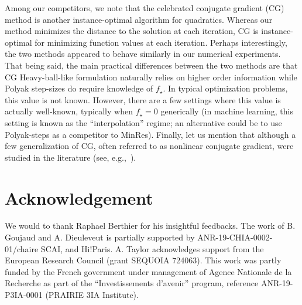 \documentclass{article}
\begin{document}
    Among our competitors, we note that the celebrated conjugate gradient (CG) method is another instance-optimal algorithm for quadratics.
    Whereas our method minimizes the distance to the solution at each iteration, CG is instance-optimal for minimizing function values at each iteration.
    Perhaps interestingly, the two methods appeared to behave similarly in our numerical experiments.
    That being said, the main practical differences between the two methods are that
    CG Heavy-ball-like formulation naturally relies on higher order information while Polyak step-sizes do require knowledge of $f_\star$.
    In typical optimization problems, this value is not known.
    However, there are a few settings where this value is actually well-known,
    typically when $f_\star=0$ generically (in machine learning, this setting is known as the ``interpolation'' regime;
    an alternative could be to use Polyak-steps as a competitor to MinRes).
    Finally, let us mention that although a few generalization of CG,
    often referred to as nonlinear conjugate gradient, were studied in the literature (see, e.g.,~\citep{bonnans2006numerical,nocedal1999numerical,hager2006survey}).

\section*{Acknowledgement}
    We would to thank Raphael Berthier for his insightful feedbacks.
    The work of B. Goujaud and A. Dieuleveut is partially supported by ANR-19-CHIA-0002-01/chaire SCAI, and Hi!Paris.
    A. Taylor acknowledges support from the European Research Council (grant SEQUOIA 724063).
    This work was partly funded by the French government under management
    of Agence Nationale de la Recherche as part of the ``Investissements d’avenir'' program,
    reference ANR-19-P3IA-0001 (PRAIRIE 3IA Institute).



\end{document}
